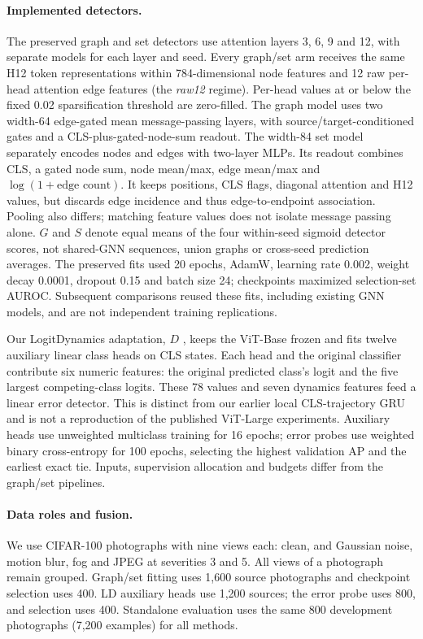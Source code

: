 \paragraph{Implemented detectors.}
The preserved graph and set detectors use attention layers 3, 6, 9 and 12,
with separate models for each layer and seed. Every graph/set arm receives
the same H12 token representations within 784-dimensional node features
and 12 raw per-head attention edge features (the \emph{raw12} regime).
Per-head values at or below the fixed 0.02 sparsification threshold are zero-filled.
The graph model uses two width-64 edge-gated mean message-passing layers,
with source/target-conditioned gates and a CLS-plus-gated-node-sum readout.
The width-84 set model separately encodes nodes and edges with two-layer
MLPs. Its readout combines CLS, a gated node sum, node mean/max, edge
mean/max and $\log(1+\text{edge count})$. It keeps positions, CLS flags,
diagonal attention and H12 values, but discards edge incidence and thus
edge-to-endpoint association. Pooling also differs; matching feature
values does not isolate message passing alone.
$G$ and $S$ denote equal means of the four within-seed sigmoid detector
scores, not shared-GNN sequences, union graphs or cross-seed prediction
averages. The preserved fits used 20 epochs, AdamW, learning rate 0.002,
weight decay 0.0001, dropout 0.15 and batch size 24; checkpoints maximized
selection-set AUROC. Subsequent comparisons reused these fits, including
existing GNN models, and are not independent training replications.

Our LogitDynamics adaptation, $D$ \citep{beigelman2026logitdynamics}, keeps
the ViT-Base frozen and fits twelve auxiliary linear class heads on CLS
states. Each head and the original classifier contribute six numeric
features: the original predicted class's logit and the five largest
competing-class logits. These 78 values and seven dynamics features feed
a linear error detector. This is distinct from our earlier local
CLS-trajectory GRU and is not a reproduction of the published ViT-Large
experiments. Auxiliary heads use unweighted multiclass training for 16
epochs; error probes use weighted binary cross-entropy for 100 epochs,
selecting the highest validation AP and the earliest exact tie. Inputs,
supervision allocation and budgets differ from the graph/set pipelines.

\paragraph{Data roles and fusion.}
We use CIFAR-100 photographs with nine views each: clean, and Gaussian
noise, motion blur, fog and JPEG at severities 3 and 5. All views of a
photograph remain grouped. Graph/set fitting uses 1,600 source photographs
and checkpoint selection uses 400. LD auxiliary heads use 1,200 sources;
the error probe uses 800, and selection uses 400. Standalone evaluation
uses the same 800 development photographs (7,200 examples) for all methods.

